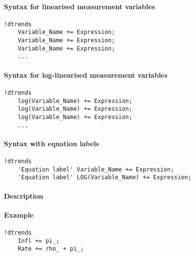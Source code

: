 


	\paragraph{Syntax for linearised measurement
variables}\label{syntax-for-linearised-measurement-variables}

\begin{verbatim}
!dtrends
    Variable_Name += Expression;
    Variable_Name += Expression;
    Variable_Name += Expression;
    ...
\end{verbatim}

\paragraph{Syntax for log-linearised measurement
variables}\label{syntax-for-log-linearised-measurement-variables}

\begin{verbatim}
!dtrends
    log(Variable_Name) += Expression;
    log(Variable_Name) += Expression;
    log(Variable_Name) += Expression;
    ...
\end{verbatim}

\paragraph{Syntax with equation
labels}\label{syntax-with-equation-labels}

\begin{verbatim}
!dtrends
    'Equation label' Variable_Name += Expression;
    'Equation label' LOG(Variable_Name) += Expression;
\end{verbatim}

\paragraph{Description}\label{description}

\paragraph{Example}\label{example}

\begin{verbatim}
!dtrends
    Infl += pi_;
    Rate += rho_ + pi_;
\end{verbatim}


